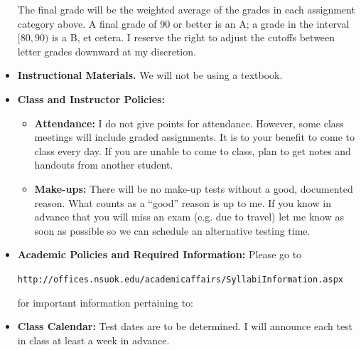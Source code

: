 \documentclass{article}
\begin{document}
\begin{itemize}
The final grade will be the weighted average of the grades in each assignment category above. A final grade of 90 or better is an A; a grade in the interval $[80,90)$ is a B, et cetera. I reserve the right to adjust the cutoffs between letter grades downward at my discretion.


\item \textbf{Instructional Materials.} We will not be using a textbook.


\item \textbf{Class and Instructor Policies:}
\begin{itemize}
\item \textbf{Attendance:} I do not give points for attendance. However, some class meetings will include graded assignments. It is to your benefit to come to class every day. If you are unable to come to class, plan to get notes and handouts from another student.

\item \textbf{Make-ups:} There will be no make-up tests without a good, documented reason. What counts as a ``good'' reason is up to me. If you know in advance that you will miss an exam (e.g. due to travel) let me know as soon as possible so we can schedule an alternative testing time.
\end{itemize}


\item \textbf{Academic Policies and Required Information:} Please go to 

\begin{center}
\texttt{http://offices.nsuok.edu/academicaffairs/SyllabiInformation.aspx}
\end{center}

for important information pertaining to:



\item \textbf{Class Calendar:} Test dates are to be determined. I will announce each test in class at least a week in advance.
\end{itemize}
\end{document}
